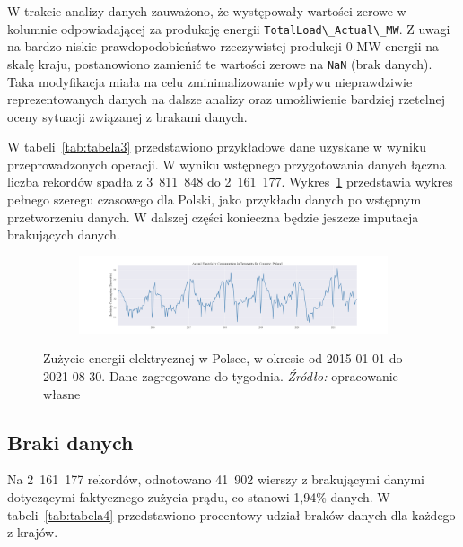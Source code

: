 \documentclass[polish, twoside, 12pt, a4paper]{article}
\theoremstyle{definition}
\theoremstyle{plain}
\theoremstyle{remark}
\newcommand{\code}[1]{\lstinline{#1}}
\begin{document}
W trakcie analizy danych zauważono, że występowały wartości zerowe w kolumnie odpowiadającej za produkcję energii \code{TotalLoad\_Actual\_MW}. Z uwagi na bardzo niskie prawdopodobieństwo rzeczywistej produkcji 0 MW energii na skalę kraju, postanowiono zamienić te wartości zerowe na \code{NaN} (brak danych). Taka modyfikacja miała na celu zminimalizowanie wpływu nieprawdziwie reprezentowanych danych na dalsze analizy oraz umożliwienie bardziej rzetelnej oceny sytuacji związanej z brakami danych.

W tabeli~\ref{tab:tabela3} przedstawiono przykładowe dane uzyskane w wyniku przeprowadzonych operacji. W wyniku wstępnego przygotowania danych łączna liczba rekordów spadła z 3~811~848 do 2~161~177. Wykres~\ref{fig:x11} przedstawia wykres pełnego szeregu czasowego dla Polski, jako przykładu danych po wstępnym przetworzeniu danych. W dalszej części konieczna będzie jeszcze imputacja brakujących danych. 

\begin{figure}[hbt]
  \centering

  \begin{subfigure}[t]{0.95\textwidth}
    \includegraphics[width=\textwidth]{./out_figures/actual_electricity_consumption_Poland.png}
  \end{subfigure}

  \captionsetup{margin=10pt,font=small,labelfont=bf,width=.8\textwidth}

  \caption[Zużycie energii elektrycznej w Polsce, w okresie od 2015-01-01 do 2021-08-30. Dane zagregowane do tygodnia.]{Zużycie energii elektrycznej w Polsce, w okresie od 2015-01-01 do 2021-08-30. Dane zagregowane do tygodnia. \textit{Źródło:} opracowanie własne}\label{fig:x11}
\end{figure}



\subsection{Braki danych}

Na 2~161~177 rekordów, odnotowano 41~902 wierszy z brakującymi danymi dotyczącymi faktycznego zużycia prądu, co stanowi 1,94\% danych. W tabeli~\ref{tab:tabela4} przedstawiono procentowy udział braków danych dla każdego z krajów. 
\end{document}
